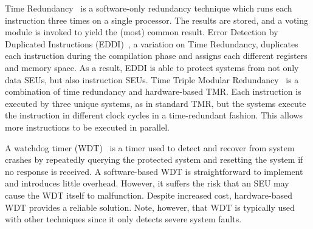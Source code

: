 Time Redundancy~\cite{ulta2013} is a software-only redundancy technique which runs each instruction three times on a single processor. The results are stored, and a voting module is invoked to yield the (most) common result. Error Detection by Duplicated Instructions (EDDI)~\cite{oh2002error}, a variation on Time Redundancy, duplicates each instruction during the compilation phase and assigns each different registers and memory space. As a result, EDDI is able to protect systems from not only data SEUs, but also instruction SEUs. Time Triple Modular Redundancy~\cite{ulta2013} is a combination of time redundancy and hardware-based TMR. Each instruction is executed by three unique systems, as in standard TMR, but the systems execute the instruction in different clock cycles in a time-redundant fashion. This allows more instructions to be executed in parallel.

A watchdog timer (WDT)~\cite{huang1986watchdog} is a timer used to detect and recover from system crashes by repeatedly querying the protected system and resetting the system if no response is received. A software-based WDT is straightforward to implement and introduces little overhead. However, 
it suffers the risk that an SEU may cause the WDT itself to malfunction. Despite increased cost, hardware-based WDT provides a reliable solution. Note, however, that WDT is typically used with other techniques since it only detects severe system faults.

